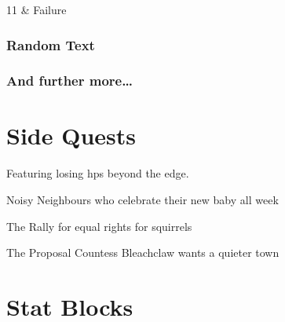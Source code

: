\documentclass[a4paper,openany]{book}
\begin{document}
\begin{multicols}{2}
\begin{boxtable}
11 & Failure \\

\end{boxtable}

\subsection{Random Text}

\lipsum[7]

\subsection{And further more\ldots}

\lipsum[10]

\begin{boxtext}
  \lipsum[4]
\end{boxtext}

\end{multicols}

\mainmatter

\chapter{Side Quests}


Featuring losing \glspl{hp} beyond the \gls{edge}.

\begin{multicols}{2}


\lipsum[2]

{Noisy Neighbours}%
{who celebrate their new baby all week}%

\lipsum[3]

{The Rally}%
{for equal rights for squirrels}%

\lipsum[3]

{The Proposal}%
{Countess Bleachclaw wants a quieter town}%

\lipsum[3]

\stopcontents[sq]

\end{multicols}

\printglossary


\chapter{Stat Blocks}
\end{document}
